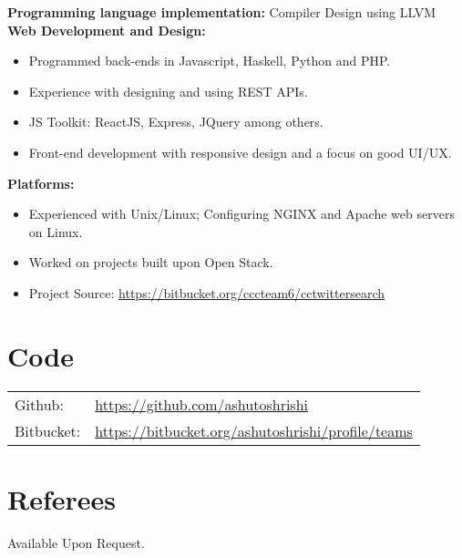 \documentclass[a4paper,overlapped]{res}
\begin{document}
\begin{resume}
  \textbf{Programming language implementation:} Compiler Design using LLVM \\
  \textbf{Web Development and Design:}
  \begin{itemize}
  \item Programmed back-ends in Javascript, Haskell, Python and PHP.
  \item Experience with designing and using REST APIs.
  \item JS Toolkit: ReactJS, Express, JQuery among
    others.
  \item Front-end development with responsive design and a focus on good UI/UX.
  \end{itemize}
  \textbf{Platforms:}
  \begin{itemize}
  \item Experienced with Unix/Linux; Configuring NGINX and Apache web servers on
    Linux.
  \item Worked on projects built upon Open Stack.
  \item Project Source: \url{https://bitbucket.org/cccteam6/cctwittersearch}
  \end{itemize}


  
  \section{Code}
  \begin{tabular}{l l}
    Github:    & \url{https://github.com/ashutoshrishi} \\
    Bitbucket: & \url{https://bitbucket.org/ashutoshrishi/profile/teams}
    \end{tabular}
  
  \section{Referees}
  Available Upon Request.

  
  
\end{resume}
\end{document}
